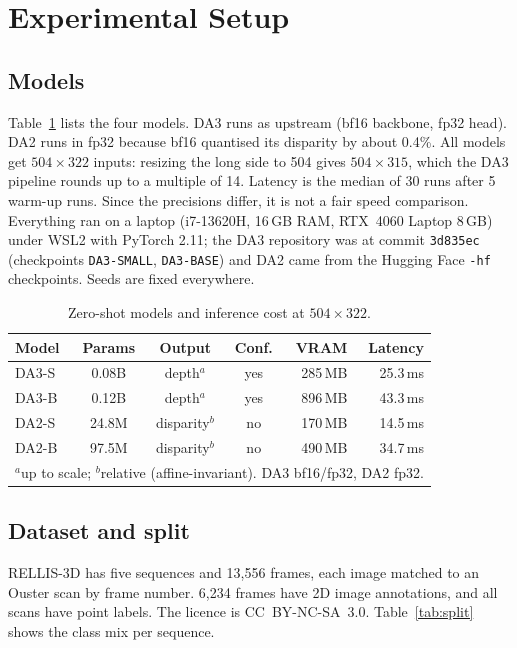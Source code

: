 \documentclass[conference]{IEEEtran}
\begin{document}
\section{Experimental Setup}

\subsection{Models}\label{sec:models}
Table~\ref{tab:models} lists the four models. DA3 runs as upstream (bf16 backbone, fp32 head). DA2 runs in fp32 because bf16 quantised its disparity by about 0.4\%. All models get $504\times322$ inputs: resizing the long side to 504 gives $504\times315$, which the DA3 pipeline rounds up to a multiple of 14. Latency is the median of 30 runs after 5 warm-up runs. Since the precisions differ, it is not a fair speed comparison. Everything ran on a laptop (i7-13620H, 16\,GB RAM, RTX~4060 Laptop 8\,GB) under WSL2 with PyTorch 2.11; the DA3 repository was at commit \texttt{3d835ec} (checkpoints \texttt{DA3-SMALL}, \texttt{DA3-BASE}) and DA2 came from the Hugging Face \texttt{-hf} checkpoints. Seeds are fixed everywhere.

\begin{table}[!t]
\caption{Zero-shot models and inference cost at $504\times322$.}
\label{tab:models}
\centering
\small
\begin{tabular}{lcccrr}
\toprule
Model & Params & Output & Conf. & VRAM & Latency \\
\midrule
DA3-S & 0.08B & depth$^a$ & yes & 285\,MB & 25.3\,ms \\
DA3-B & 0.12B & depth$^a$ & yes & 896\,MB & 43.3\,ms \\
DA2-S & 24.8M & disparity$^b$ & no & 170\,MB & 14.5\,ms \\
DA2-B & 97.5M & disparity$^b$ & no & 490\,MB & 34.7\,ms \\
\bottomrule
\multicolumn{6}{l}{\scriptsize $^a$up to scale; $^b$relative (affine-invariant). DA3 bf16/fp32, DA2 fp32.}
\end{tabular}
\end{table}

\subsection{Dataset and split}
RELLIS-3D has five sequences and 13{,}556 frames, each image matched to an Ouster scan by frame number. 6{,}234 frames have 2D image annotations, and all scans have point labels. The licence is CC~BY-NC-SA~3.0. Table~\ref{tab:split} shows the class mix per sequence.
\end{document}
